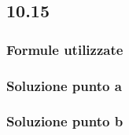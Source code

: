 \documentclass[../../main.tex]{subfiles}
\begin{document}
\subsection*{10.15}
\subsubsection*{Formule utilizzate}
\subsubsection*{Soluzione punto a}
\subsubsection*{Soluzione punto b}
\newpage
\end{document}
